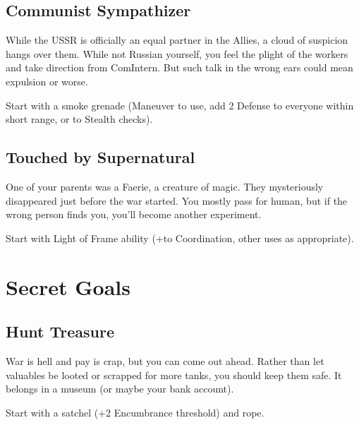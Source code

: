 \documentclass{book}
\newcommand{\bbb}{\BoostDie }
\begin{document}
\begin{multicols}{2}
\subsection{Communist Sympathizer}

While the USSR is officially an equal partner in the Allies, a cloud of suspicion hangs over them.  While not Russian yourself, you feel the plight of the workers and take direction from ComIntern.  But such talk in the wrong ears could mean expulsion or worse.

Start with a smoke grenade (Maneuver to use, add 2 Defense to everyone within short range, or \bbb\bbb to Stealth checks).

%
%

\subsection{Touched by Supernatural}

One of your parents was a Faerie, a creature of magic.  They mysteriously disappeared just before the war started.  You mostly pass for human, but if the wrong person finds you, you'll become another experiment.

Start with Light of Frame ability (+\bbb to Coordination, other uses as appropriate).

\section{Secret Goals}

\subsection{Hunt Treasure}

War is hell and pay is crap, but you can come out ahead.  Rather than let valuables be looted or scrapped for more tanks, you should keep them safe.  It belongs in a museum (or maybe your bank account).

Start with a satchel (+2 Encumbrance threshold) and rope.



\end{multicols}
\end{document}
